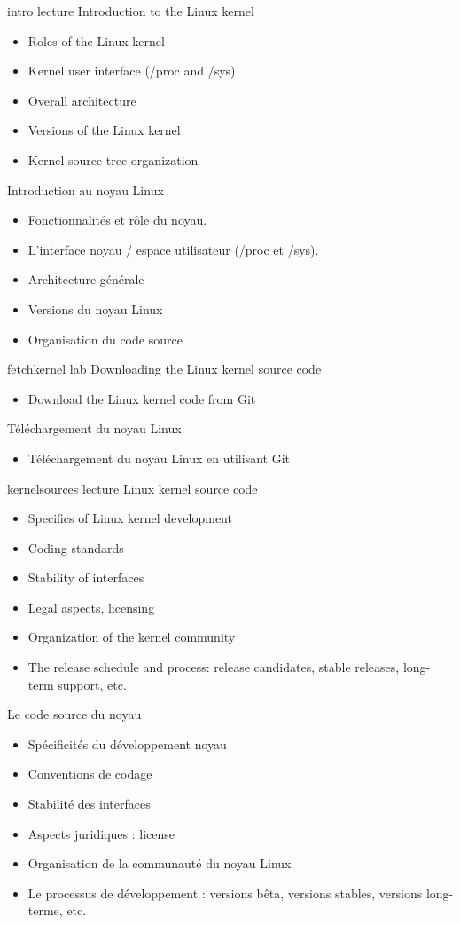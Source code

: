 {intro}
{lecture}
{Introduction to the Linux kernel}
{
  \begin{itemize}
  \item Roles of the Linux kernel
  \item Kernel user interface (/proc and /sys)
  \item Overall architecture
  \item Versions of the Linux kernel
  \item Kernel source tree organization
  \end{itemize}
}
{Introduction au noyau Linux}
{
  \begin{itemize}
  \item Fonctionnalités et rôle du noyau.
  \item L'interface noyau / espace utilisateur (/proc et /sys).
  \item Architecture générale
  \item Versions du noyau Linux
  \item Organisation du code source
  \end{itemize}
}
{fetchkernel}
{lab}
{Downloading the Linux kernel source code}
{
  \begin{itemize}
  \item Download the Linux kernel code from Git
  \end{itemize}
}
{Téléchargement du noyau Linux}
{
  \begin{itemize}
  \item Téléchargement du noyau Linux en utilisant Git
  \end{itemize}
}
{kernelsources}
{lecture}
{Linux kernel source code}
{
  \begin{itemize}
  \item Specifics of Linux kernel development
  \item Coding standards
  \item Stability of interfaces
  \item Legal aspects, licensing
  \item Organization of the kernel community
  \item The release schedule and process: release candidates, stable
    releases, long-term support, etc.
  \end{itemize}
}
{Le code source du noyau}
{
  \begin{itemize}
  \item Spécificités du développement noyau
  \item Conventions de codage
  \item Stabilité des interfaces
  \item Aspects juridiques : license
  \item Organisation de la communauté du noyau Linux
  \item Le processus de développement : versions bêta, versions stables,
    versions long-terme, etc.
 \end{itemize}
}

